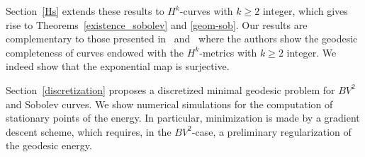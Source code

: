 Section~\ref{Hs} extends these results to $H^k$-curves with $k\geq 2$ integer, which gives rise to Theorems~\ref{existence_sobolev} and \ref{geom-sob}.  Our results are complementary to those presented in~\cite{MuMi_ov} and~\cite{Bruveris} where the authors show the geodesic completeness of curves endowed with the $H^k$-metrics with $k \geq 2$ integer. We indeed show that the exponential map is surjective.

Section~\ref{discretization} proposes a discretized minimal geodesic problem for $BV^2$ and Sobolev curves. We show  numerical simulations for the computation of stationary points of the energy. In particular, minimization is made by a gradient descent scheme, which requires, in the $BV^2$-case, a preliminary regularization of the geodesic energy.  
